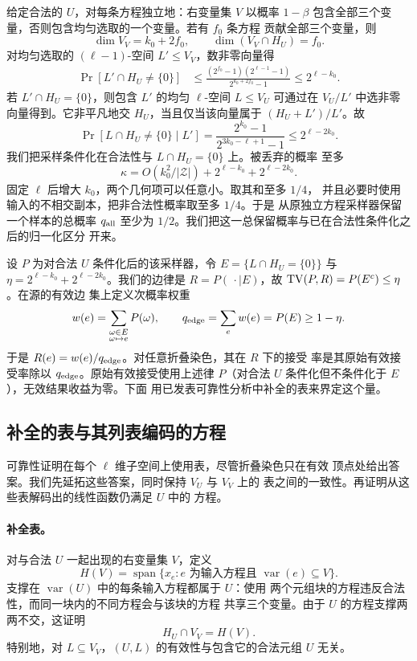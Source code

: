 给定合法的 $U$，对每条方程独立地：右变量集 $V$ 以概率 $1-\beta$
包含全部三个变量，否则包含均匀选取的一个变量。若有 $f_0$ 条方程
贡献全部三个变量，则
\[
  \dim V_V=k_0+2f_0,
  \qquad \dim(V_V\cap H_U)=f_0.
\]
对均匀选取的 $(\ell-1)$-空间 $L'\leq V_V$，数非零向量得
\begin{align*}
  \Pr[L'\cap H_U\ne\{0\}]
  &\leq
  \frac{(2^{f_0}-1)(2^{\ell-1}-1)}{2^{k_0+2f_0}-1}
  \leq 2^{\ell-k_0}.
\end{align*}
若 $L'\cap H_U=\{0\}$，则包含 $L'$ 的均匀 $\ell$-空间
$L\leq V_U$ 可通过在 $V_U/L'$ 中选非零向量得到。它非平凡地交
$H_U$，当且仅当该向量属于 $(H_U+L')/L'$。故
\[
  \Pr[L\cap H_U\ne\{0\}\mid L']
  =\frac{2^{k_0}-1}{2^{3k_0-\ell+1}-1}
  \leq 2^{\ell-2k_0}.
\]
我们把采样条件化在合法性与 $L\cap H_U=\{0\}$ 上。被丢弃的概率
至多
\begin{equation}
  \kappa=O(k_0^2/|\mathcal Z|)
          +2^{\ell-k_0}+2^{\ell-2k_0}.
  \label{eq:affine-invalid-probability}
\end{equation}
固定 $\ell$ 后增大 $k_0$，两个几何项可以任意小。取其和至多 $1/4$，
并且必要时使用输入的不相交副本，把非合法性概率取至多 $1/4$。于是
从原独立方程采样器保留一个样本的总概率 $q_{\rm all}$ 至少为
$1/2$。我们把这一总保留概率与已在合法性条件化之后的归一化区分
开来。

设 $P$ 为对合法 $U$ 条件化后的该采样器，令 $E=\{L\cap H_U=\{0\}\}$
与 $\eta=2^{\ell-k_0}+2^{\ell-2k_0}$。我们的边律是
$R=P(\,\cdot\mid E)$，故 $\operatorname{TV}(P,R)=P(E^c)\leq\eta$。在源的有效边
集上定义次概率权重
\[
 w(e)=\sum_{\substack{\omega\in E\\\omega\mapsto e}}P(\omega),
 \qquad q_{\rm edge}=\sum_e w(e)=P(E)\geq1-\eta.
\]
于是 $R(e)=w(e)/q_{\rm edge}$。对任意折叠染色，其在 $R$ 下的接受
率是其原始有效接受率除以 $q_{\rm edge}$。原始有效接受使用上述律
$P$（对合法 $U$ 条件化但不条件化于 $E$），无效结果收益为零。下面
用已发表可靠性分析中补全的表来界定这个量。

\subsection{补全的表与其列表编码的方程}

可靠性证明在每个 $\ell$ 维子空间上使用表，尽管折叠染色只在有效
顶点处给出答案。我们先延拓这些答案，同时保持 $V_U$ 与 $V_V$ 上的
表之间的一致性。再证明从这些表解码出的线性函数仍满足 $U$ 中的
方程。

\paragraph{补全表。}
对与合法 $U$ 一起出现的右变量集 $V$，定义
\[
  H(V)=\operatorname{span}\{x_e:e\text{ 为输入方程且 }
                                     \operatorname{var}(e)\subseteq V\}.
\]
支撑在 $\operatorname{var}(U)$ 中的每条输入方程都属于 $U$：使用
两个元组块的方程违反合法性，而同一块内的不同方程会与该块的方程
共享三个变量。由于 $U$ 的方程支撑两两不交，这证明
\begin{equation}
  H_U\cap V_V=H(V).
  \label{eq:affine-validity-common-side-space}
\end{equation}
特别地，对 $L\subseteq V_V$，$(U,L)$ 的有效性与包含它的合法元组
$U$ 无关。

